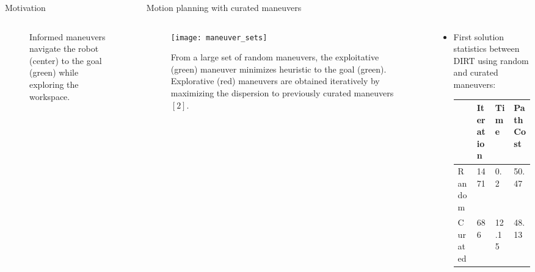 \begin{columns}[t]
\begin{column}{0.5\textwidth}
\begin{block}{\large Motivation}
\begin{columns}[t]
\begin{column}{0.35\textwidth}
\begin{figure}
					\caption{Informed maneuvers navigate the robot (center) to the goal (green) while exploring the workspace. \vspace{-.2in}}
					\end{figure}
			    \end{column}
		    \end{columns}
		\end{block}
	\end{column}
	\begin{column}{0.5\textwidth}
		\begin{block}{\large Motion planning with curated maneuvers}
		    \begin{columns}[T]
		    	\begin{column}{0.38\textwidth}
		    	\begin{figure}
		    	\vspace{-0.2in}
		    	\centering
				\texttt{[image: maneuver\_sets]}
				\caption{From a large set of random maneuvers, the exploitative (green) maneuver minimizes heuristic to the goal (green). Explorative (red) maneuvers are obtained iteratively by maximizing the dispersion to previously curated maneuvers $[2]$. \vspace{-.2in}}
				\end{figure}
		    	\end{column}
		    	\begin{column}{0.6\textwidth}
		    	\vspace{-0.2in}
					\begin{itemize}
					\item First solution statistics between DIRT using random and curated maneuvers:
					\vspace{0.05in}
					\begin{table}[h!]
						\centering
						\begin{tabular}{|l|l|l|l|}
						\hline
						        & \textbf{Iteration} & \textbf{Time} & \textbf{Path Cost} \\ [0.5ex] \hline
						Random  & 1471                    & 0.2                   & 50.47                  \\ \hline
						Curated & 686                    & 12.15                & 48.13                  \\ \hline
						\end{tabular}

\end{table}
\end{itemize}
\end{column}
\end{columns}
\end{block}
\end{column}
\end{columns}
